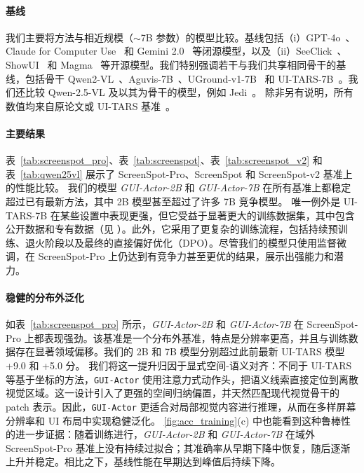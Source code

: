 \documentclass{article}
\newcommand{\sys}{\texttt{GUI-Actor}\xspace}
\begin{document}





\paragraph{基线}
我们主要将方法与相近规模（$\sim$7B 参数）的模型比较。基线包括（i）GPT-4o~\cite{openai2024gpt4o}、Claude for Computer Use~\cite{hu2024dawnguiagentpreliminary} 和 Gemini 2.0~\cite{google2024gemini} 等闭源模型，以及（ii）SeeClick~\cite{cheng2024seeclick}、ShowUI~\cite{lin2024showui} 和 Magma~\cite{yang2025magma} 等开源模型。我们特别强调若干与我们共享相同骨干的基线，包括骨干 Qwen2-VL~\cite{wang2024qwen2}、Aguvis-7B~\cite{xu2024aguvis}、UGround-v1-7B~\cite{gou2024navigating} 和 UI-TARS-7B~\cite{qin2025ui}。我们还比较 Qwen-2.5-VL 及以其为骨干的模型，例如 Jedi~\cite{xie2025scaling}。
除非另有说明，所有数值均来自原论文或 UI-TARS 基准~\cite{qin2025ui}。

\paragraph{主要结果}
表~\ref{tab:screenspot_pro}、表~\ref{tab:screenspot}、表~\ref{tab:screenspot_v2} 和表~\ref{tab:qwen25vl} 展示了 ScreenSpot-Pro、ScreenSpot 和 ScreenSpot-v2 基准上的性能比较。
我们的模型 \textit{GUI-Actor-2B} 和 \textit{GUI-Actor-7B} 在所有基准上都稳定超过已有最新方法，其中 2B 模型甚至超过了许多 7B 竞争模型。
唯一例外是 UI-TARS-7B 在某些设置中表现更强，但它受益于显著更大的训练数据集，其中包含公开数据和专有数据（见 ）。此外，它采用了更复杂的训练流程，包括持续预训练、退火阶段以及最终的直接偏好优化（DPO）。尽管我们的模型只使用监督微调，在 ScreenSpot-Pro 上仍达到有竞争力甚至更优的结果，展示出强能力和潜力。

\paragraph{稳健的分布外泛化}
如表~\ref{tab:screenspot_pro} 所示，\textit{GUI-Actor-2B} 和 \textit{GUI-Actor-7B} 在 ScreenSpot-Pro 上都表现强劲。该基准是一个分布外基准，特点是分辨率更高，并且与训练数据存在显著领域偏移。我们的 2B 和 7B 模型分别超过此前最新 UI-TARS 模型 +9.0 和 +5.0 分。
我们将这一提升归因于显式空间-语义对齐：不同于 UI-TARS 等基于坐标的方法，\sys 使用注意力式动作头，把语义线索直接定位到离散视觉区域。这一设计引入了更强的空间归纳偏置，并天然匹配现代视觉骨干的 patch 表示。因此，\sys 更适合对局部视觉内容进行推理，从而在多样屏幕分辨率和 UI 布局中实现稳健泛化。
\ref{fig:acc_training}(c) 中也能看到这种鲁棒性的进一步证据：随着训练进行，\textit{GUI-Actor-2B} 和 \textit{GUI-Actor-7B} 在域外 ScreenSpot-Pro 基准上没有持续过拟合；其准确率从早期下降中恢复，随后逐渐上升并稳定。相比之下，基线性能在早期达到峰值后持续下降。
\end{document}
